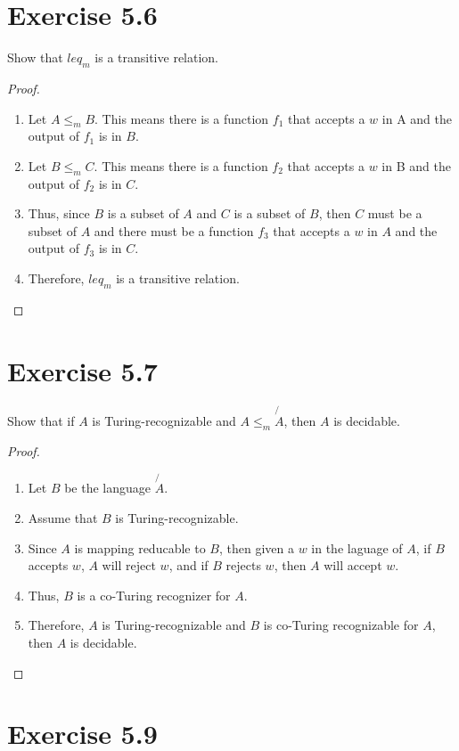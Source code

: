 \documentclass{article}
\begin{document}
\section{Exercise 5.6}

Show that $leq_m$ is a transitive relation.

\begin{proof}
	\mbox{}
	\begin{enumerate}
	  \item Let $A \leq_m B$. This means there is a function $f_1$ that accepts a
	  $w$ in A and the output of $f_1$ is in $B$.
	  \item Let $B \leq_m C$. This means there is a function $f_2$ that accepts a
	  $w$ in B and the output of $f_2$ is in $C$.
	  \item Thus, since $B$ is a subset of $A$ and $C$ is a subset of $B$,
	  then $C$ must be a subset of $A$ and there must be a function $f_3$ that
	  accepts a $w$ in $A$ and the output of $f_3$ is in $C$.
	  \item Therefore, $leq_m$ is a transitive relation. \qedhere
	\end{enumerate}
\end{proof}

\section{Exercise 5.7}

Show that if $A$ is Turing-recognizable and $A \leq_m \not{A}$, then $A$ is
decidable.

\begin{proof}
	\mbox{}
	\begin{enumerate}
	  \item Let $B$ be the language $\not{A}$.
	  \item Assume that $B$ is Turing-recognizable.
	  \item Since $A$ is mapping reducable to $B$, then given a $w$ in the laguage
	  of $A$, if $B$ accepts $w$, $A$ will reject $w$, and if $B$ rejects $w$,
	  then $A$ will accept $w$.
	  \item Thus, $B$ is a co-Turing recognizer for $A$. 
	  \item Therefore, $A$ is Turing-recognizable and $B$ is co-Turing recognizable
	  for $A$, then $A$ is decidable. \qedhere
	\end{enumerate}
\end{proof}

\section{Exercise 5.9}
\end{document}

